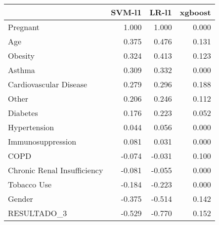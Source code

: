 \begin{tabular}{lrrr}
\toprule
{} &  SVM-l1 &  LR-l1 &  xgboost \\
\midrule
Pregnant                    &   1.000 &  1.000 &    0.000 \\
Age                         &   0.375 &  0.476 &    0.131 \\
Obesity                     &   0.324 &  0.413 &    0.123 \\
Asthma                      &   0.309 &  0.332 &    0.000 \\
Cardiovascular Disease      &   0.279 &  0.296 &    0.188 \\
Other                       &   0.206 &  0.246 &    0.112 \\
Diabetes                    &   0.176 &  0.223 &    0.052 \\
Hypertension                &   0.044 &  0.056 &    0.000 \\
Immunosuppression           &   0.081 &  0.031 &    0.000 \\
COPD                        &  -0.074 & -0.031 &    0.100 \\
Chronic Renal Insufficiency &  -0.081 & -0.055 &    0.000 \\
Tobacco Use                 &  -0.184 & -0.223 &    0.000 \\
Gender                      &  -0.375 & -0.514 &    0.142 \\
RESULTADO\_3                 &  -0.529 & -0.770 &    0.152 \\
\bottomrule
\end{tabular}
